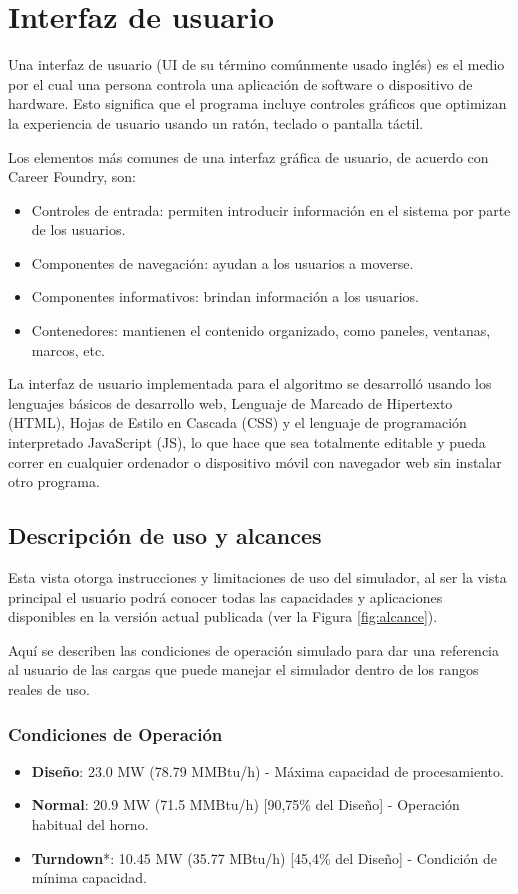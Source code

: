 \section{Interfaz de usuario}
\par Una interfaz de usuario (UI de su término comúnmente usado inglés) es el medio por el cual una persona controla una aplicación de software o dispositivo de hardware. Esto significa que el programa incluye controles gráficos que optimizan la experiencia de usuario usando un ratón, teclado o pantalla táctil.
\par Los elementos más comunes de una interfaz gráfica de usuario, de acuerdo con Career Foundry\cite{ui}, son:
\begin{itemize}
\item Controles de entrada: permiten introducir información en el sistema por parte de los usuarios.
\item Componentes de navegación: ayudan a los usuarios a moverse.
\item Componentes informativos: brindan información a los usuarios.
\item Contenedores: mantienen el contenido organizado, como paneles, ventanas, marcos, etc.
\end{itemize}

\par La interfaz de usuario implementada para el algoritmo se desarrolló usando los lenguajes básicos de desarrollo web, Lenguaje de Marcado de Hipertexto (HTML), Hojas de Estilo en Cascada (CSS) y el lenguaje de programación interpretado JavaScript (JS), lo que hace que sea totalmente editable y pueda correr en cualquier ordenador o dispositivo móvil con navegador web sin instalar otro programa.

\subsection{Descripción de uso y alcances}
\par Esta vista otorga instrucciones y limitaciones de uso del simulador, al ser la vista principal el usuario podrá conocer todas las capacidades y aplicaciones disponibles en la versión actual publicada (ver la Figura \ref{fig:alcance}).
\par Aquí se describen las condiciones de operación simulado para dar una referencia al usuario de las cargas que puede manejar el simulador dentro de los rangos reales de uso.

\subsubsection{Condiciones de Operación}
\begin{itemize}
\item \textbf{Diseño}: 23.0 MW (78.79 MMBtu/h) - Máxima capacidad de procesamiento.
\item \textbf{Normal}: 20.9 MW (71.5 MMBtu/h) [90,75\% del Diseño] - Operación habitual del horno.
\item \textbf{Turndown}*: 10.45 MW (35.77 MBtu/h) [45,4\% del Diseño] - Condición de mínima capacidad.
\end{itemize}

